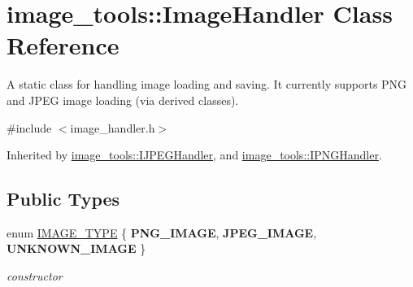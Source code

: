 \hypertarget{classimage__tools_1_1ImageHandler}{}\section{image\+\_\+tools\+:\+:Image\+Handler Class Reference}
\label{classimage__tools_1_1ImageHandler}


A static class for handling image loading and saving. It currently supports P\+NG and J\+P\+EG image loading (via derived classes).  




{\ttfamily \#include $<$image\+\_\+handler.\+h$>$}



Inherited by \hyperlink{classimage__tools_1_1IJPEGHandler}{image\+\_\+tools\+::\+I\+J\+P\+E\+G\+Handler}, and \hyperlink{classimage__tools_1_1IPNGHandler}{image\+\_\+tools\+::\+I\+P\+N\+G\+Handler}.

\subsection*{Public Types}
\begin{DoxyCompactItemize}
\item 
enum \hyperlink{classimage__tools_1_1ImageHandler_a1ad849e8783b00364ed9353861540868}{I\+M\+A\+G\+E\+\_\+\+T\+Y\+PE} \{ {\bfseries P\+N\+G\+\_\+\+I\+M\+A\+GE}, 
{\bfseries J\+P\+E\+G\+\_\+\+I\+M\+A\+GE}, 
{\bfseries U\+N\+K\+N\+O\+W\+N\+\_\+\+I\+M\+A\+GE}
 \}\hypertarget{classimage__tools_1_1ImageHandler_a1ad849e8783b00364ed9353861540868}{}\label{classimage__tools_1_1ImageHandler_a1ad849e8783b00364ed9353861540868}
\begin{DoxyCompactList}\small\item\em constructor \end{DoxyCompactList}
\end{DoxyCompactItemize}
